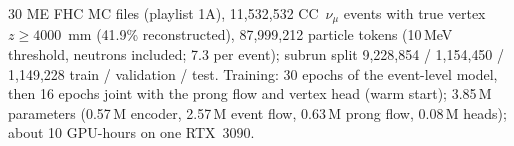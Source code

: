 30 ME FHC MC files (playlist 1A), 11{,}532{,}532 CC~$\nu_\mu$ events with true vertex $z \ge 4000$~mm (41.9\% reconstructed), 87{,}999{,}212 particle tokens (10\,MeV threshold, neutrons included; 7.3 per event); subrun split 9{,}228{,}854 / 1{,}154{,}450 / 1{,}149{,}228 train / validation / test. Training: 30 epochs of the event-level model, then 16 epochs joint with the prong flow and vertex head (warm start); 3.85\,M parameters (0.57\,M encoder, 2.57\,M event flow, 0.63\,M prong flow, 0.08\,M heads); about 10 GPU-hours on one RTX~3090.
